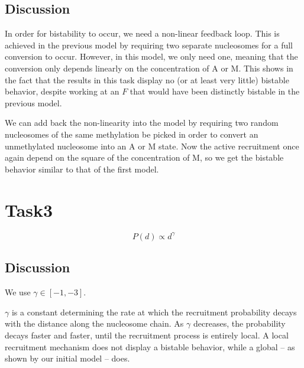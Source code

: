 \documentclass{article}
\begin{document}
\subsection{Discussion}

In order for bistability to occur, we need a non-linear feedback loop. This is achieved in the previous model by requiring two separate nucleosomes for a full conversion to occur. However, in this model, we only need one, meaning that the conversion only depends linearly on the concentration of A or M. This shows in the fact that the results in this task display no (or at least very little) bistable behavior, despite working at an $F$ that would have been distinctly bistable in the previous model. 

We can add back the non-linearity into the model by requiring two random nucleosomes of the same methylation be picked in order to convert an unmethylated nucleosome into an A or M state. Now the active recruitment once again depend on the square of the concentration of M, so we get the bistable behavior similar to that of the first model. 



\section{Task3}
\begin{equation}
	P(d) \propto d^\gamma
\end{equation}
\subsection{Discussion}
We use $\gamma\in [-1,-3]$. 

$\gamma$ is a constant determining the rate at which the recruitment probability decays with the distance along the nucleosome chain. As $\gamma$ decreases, the probability decays faster and faster, until the recruitment process is entirely local. A local recruitment mechanism does not display a bistable behavior, while a global -- as shown by our initial model -- does. 
\end{document}
